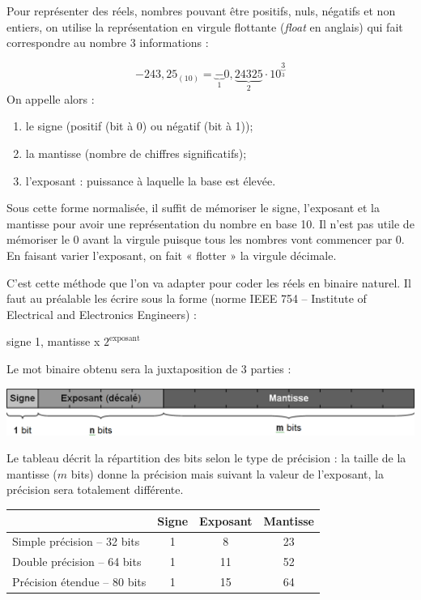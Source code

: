 \documentclass[10pt,fleqn]{article} %
\begin{document}
Pour représenter des réels, nombres pouvant être positifs, nuls, négatifs et non entiers, on utilise la représentation en virgule flottante (\textit{float} en anglais) qui fait correspondre au nombre 3 informations :

$$
-243,25_{(10)} = \underbrace{-}_{1}0,\underbrace{24325}_{2}\cdot10^{\underbrace{3}_{3}}
$$
On appelle alors : 
\begin{enumerate}
\item le signe (positif (bit à 0) ou négatif (bit à 1));
\item la mantisse (nombre de chiffres significatifs);
\item l'exposant : puissance à laquelle la base est élevée. 
\end{enumerate}

Sous cette forme normalisée, il suffit de mémoriser le signe, l’exposant et la mantisse pour avoir une représentation du nombre en base 10. Il n’est pas utile de mémoriser le 0 avant la virgule puisque tous les nombres vont commencer par 0. En faisant varier l’exposant, on fait « flotter » la virgule décimale.

C’est cette méthode que l’on va adapter pour coder les réels en binaire naturel. Il faut au préalable les écrire sous la forme (norme IEEE 754 – Institute of Electrical and Electronics Engineers) :

\begin{center}
signe 1, mantisse x $2^{\text{exposant}}$
\end{center}

Le mot binaire obtenu sera la juxtaposition de 3 parties :

\begin{center}
\includegraphics[width=.7\textwidth]{images/reel_1}
\end{center}


\begin{minipage}[c]{.4\linewidth}
Le tableau décrit la répartition des bits selon le type de précision : la taille de la mantisse ($m$ bits) donne la précision mais suivant la valeur de l'exposant, la précision sera totalement différente. 


\end{minipage}\hfill
\begin{minipage}[c]{.59\linewidth}
\begin{center}
\begin{tabular}{| l |c|c|c|}
\hline

& Signe & Exposant & Mantisse \\ \hline
 Simple précision -- 32 bits & 1 & 8 & 23 \\ \hline
 Double précision -- 64 bits & 1 & 11 & 52 \\ \hline
 Précision étendue -- 80 bits & 1 & 15 & 64 \\ \hline
\end{tabular}
\end{center}
\end{minipage}
\end{document}
